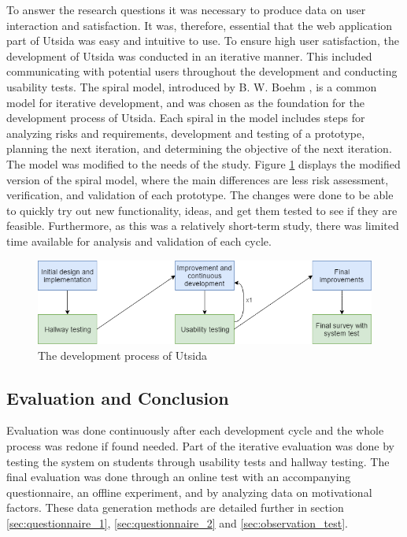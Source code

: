 To answer the research questions it was necessary to produce data on user interaction and satisfaction. It was, therefore, essential that the web application part of Utsida was easy and intuitive to use. To ensure high user satisfaction, the development of Utsida was conducted in an iterative manner. This included communicating with potential users throughout the development and conducting usability tests. The spiral model, introduced by B. W. Boehm \cite{boehm1988spiral}, is a common model for iterative development, and was chosen as the foundation for the development process of Utsida. Each spiral in the model includes steps for analyzing risks and requirements, development and testing of a prototype, planning the next iteration, and determining the objective of the next iteration. The model was modified to the needs of the study. Figure \ref{fig:development_process} displays the modified version of the spiral model, where the main differences are less risk assessment, verification, and validation of each prototype. The changes were done to be able to quickly try out new functionality, ideas, and get them tested to see if they are feasible. Furthermore, as this was a relatively short-term study, there was limited time available for analysis and validation of each cycle.

\begin{figure}[h]
    \centering
    \includegraphics[width=1\textwidth]{fig/development_process.png}
    \caption{The development process of Utsida}
    \label{fig:development_process}
\end{figure}

\subsection{Evaluation and Conclusion}

Evaluation was done continuously after each development cycle and the whole process was redone if found needed. Part of the iterative evaluation was done by testing the system on students through usability tests and hallway testing. The final evaluation was done through an online test with an accompanying questionnaire, an offline experiment, and by analyzing data on motivational factors. These data generation methods are detailed further in section \ref{sec:questionnaire_1}, \ref{sec:questionnaire_2} and \ref{sec:observation_test}.

